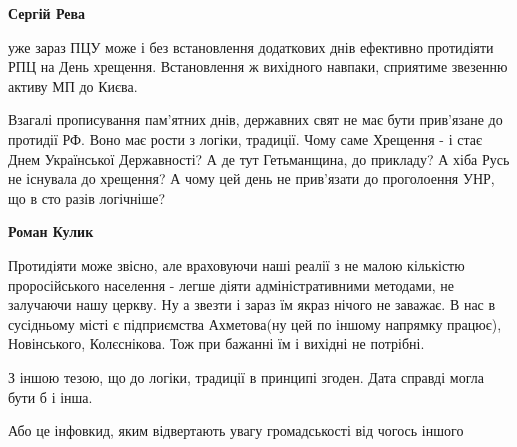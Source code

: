 \begin{itemize}
\begin{itemize}
 
\textbf{Сергій Рева} 

уже зараз ПЦУ може і без встановлення додаткових днів ефективно протидіяти РПЦ
на День хрещення. Встановлення ж вихідного навпаки, сприятиме звезенню активу
МП до Києва.

Взагалі прописування пам'ятних днів, державних свят не має бути прив'язане до
протидії РФ. Воно має рости з логіки, традиції. Чому саме Хрещення - і стає
Днем Української Державності? А де тут Гетьманщина, до прикладу? А хіба Русь не
існувала до хрещення? А чому цей день не прив'язати до проголоення УНР, що в
сто разів логічніше?


 
\textbf{Роман Кулик} 

Протидіяти може звісно, але враховуючи наші реалії з не малою кількістю
проросійського населення - легше діяти адміністративними методами, не залучаючи
нашу церкву. Ну а звезти і зараз їм якраз нічого не заважає. В нас в сусідньому
місті є підприємства Ахметова(ну цей по іншому напрямку працює), Новінського,
Колєснікова. Тож при бажанні їм і вихідні не потрібні.

З іншою тезою, що до логіки, традиції в принципі згоден. Дата справді могла
бути б і інша.

\end{itemize}

 
Або це інфовкид, яким відвертають увагу громадськості від чогось іншого

\begin{itemize}
 

\end{itemize}
\end{itemize}
